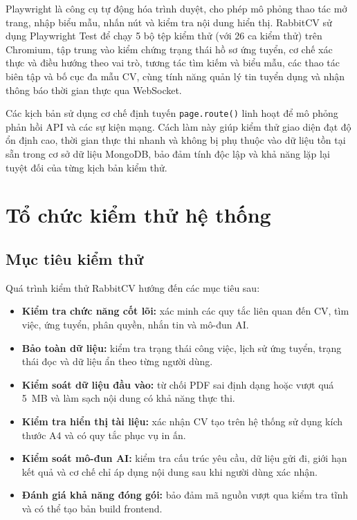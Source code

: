 Playwright là công cụ tự động hóa trình duyệt, cho phép mô phỏng thao tác mở trang, nhập biểu mẫu, nhấn nút và kiểm tra nội dung hiển thị. RabbitCV sử dụng Playwright Test để chạy 5 bộ tệp kiểm thử (với 26 ca kiểm thử) trên Chromium, tập trung vào kiểm chứng trạng thái hồ sơ ứng tuyển, cơ chế xác thực và điều hướng theo vai trò, tương tác tìm kiếm và biểu mẫu, các thao tác biên tập và bố cục đa mẫu CV, cùng tính năng quản lý tin tuyển dụng và nhận thông báo thời gian thực qua WebSocket.

Các kịch bản sử dụng cơ chế định tuyến \texttt{page.route()} linh hoạt để mô phỏng phản hồi API và các sự kiện mạng. Cách làm này giúp kiểm thử giao diện đạt độ ổn định cao, thời gian thực thi nhanh và không bị phụ thuộc vào dữ liệu tồn tại sẵn trong cơ sở dữ liệu MongoDB, bảo đảm tính độc lập và khả năng lặp lại tuyệt đối của từng kịch bản kiểm thử.


\section{Tổ chức kiểm thử hệ thống}

\subsection{Mục tiêu kiểm thử}

Quá trình kiểm thử RabbitCV hướng đến các mục tiêu sau:

\begin{itemize}
    \item \textbf{Kiểm tra chức năng cốt lõi:} xác minh các quy tắc liên quan đến CV, tìm việc, ứng tuyển, phân quyền, nhắn tin và mô-đun AI.
    \item \textbf{Bảo toàn dữ liệu:} kiểm tra trạng thái công việc, lịch sử ứng tuyển, trạng thái đọc và dữ liệu ẩn theo từng người dùng.
    \item \textbf{Kiểm soát dữ liệu đầu vào:} từ chối PDF sai định dạng hoặc vượt quá 5~MB và làm sạch nội dung có khả năng thực thi.
    \item \textbf{Kiểm tra hiển thị tài liệu:} xác nhận CV tạo trên hệ thống sử dụng kích thước A4 và có quy tắc phục vụ in ấn.
    \item \textbf{Kiểm soát mô-đun AI:} kiểm tra cấu trúc yêu cầu, dữ liệu gửi đi, giới hạn kết quả và cơ chế chỉ áp dụng nội dung sau khi người dùng xác nhận.
    \item \textbf{Đánh giá khả năng đóng gói:} bảo đảm mã nguồn vượt qua kiểm tra tĩnh và có thể tạo bản build frontend.
\end{itemize}

